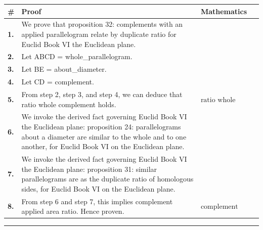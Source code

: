 \documentclass[11pt]{article}
\theoremstyle{definition}
\begin{document}
\begin{tabular}{@{} >{\raggedright\arraybackslash}p{} >{\raggedright\arraybackslash}p{} >{\raggedleft\arraybackslash}p{} @{}}
\textbf{\#} & \textbf{Proof} & \textbf{Mathematics} \\
\midrule
\textbf{1.} & We prove that proposition 32: complements with an applied parallelogram relate by duplicate ratio for Euclid Book VI the Euclidean plane. & \\[0.45em]
\textbf{2.} & Let ABCD = whole\_parallelogram. & \\[0.45em]
\textbf{3.} & Let BE = about\_diameter. & \\[0.45em]
\textbf{4.} & Let CD = complement. & \\[0.45em]
\textbf{5.} & From step 2, step 3, and step 4, we can deduce that ratio whole complement holds. & $\displaystyle \text{ratio whole complement holds}$ \\[0.45em]
\textbf{6.} & We invoke the derived fact governing Euclid Book VI the Euclidean plane: proposition 24: parallelograms about a diameter are similar to the whole and to one another, for Euclid Book VI on the Euclidean plane. & \\[0.45em]
\textbf{7.} & We invoke the derived fact governing Euclid Book VI the Euclidean plane: proposition 31: similar parallelograms are as the duplicate ratio of homologous sides, for Euclid Book VI on the Euclidean plane. & \\[0.45em]
\textbf{8.} & From step 6 and step 7, this implies complement applied area ratio. Hence proven. & $\displaystyle \text{complement applied area ratio}$ \\[0.45em]
\bottomrule
\end{tabular}
\label{thm:Geometry-Euclid Book VI-proposition_32_complements_with_an_applied_parallelogram_relate_by_duplicate_ratio}
\par\medskip\hrule
\end{document}
